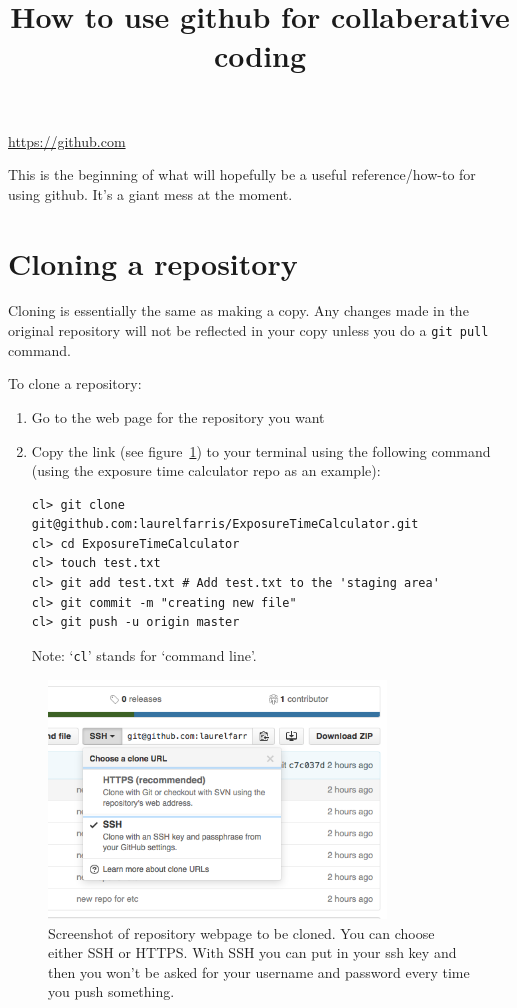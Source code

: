 \documentclass{article}
\title{How to use github for collaberative coding}
\date{}
\begin{document}
\maketitle

\url{https://github.com}

This is the beginning of what will hopefully be a useful reference/how-to
for using github. It's a giant mess at the moment.

\section{Cloning a repository}
Cloning is essentially the same as making a copy. Any changes made
in the original repository will not be reflected in your copy unless
you do a \texttt{git pull} command.

To clone a repository:
\begin{enumerate}
    \item Go to the web page for the repository you want
    \item Copy the link (see figure~\ref{gitlink})
        to your terminal using the following command
        (using the exposure time calculator repo as an example):
\begin{verbatim}
cl> git clone git@github.com:laurelfarris/ExposureTimeCalculator.git
cl> cd ExposureTimeCalculator
cl> touch test.txt
cl> git add test.txt # Add test.txt to the 'staging area'
cl> git commit -m "creating new file"
cl> git push -u origin master
\end{verbatim}
        Note: `\texttt{cl}' stands for `command line'.
\end{enumerate}
\begin{figure}
\includegraphics[width=0.8\textwidth]{gitlink.png}
\caption{Screenshot of repository webpage to be cloned. You can choose
    either SSH or HTTPS\@. With SSH you can put in your ssh key and then
    you won't be asked for your username and password every time you push
    something.}
\label{gitlink}
\end{figure}
\end{document}
